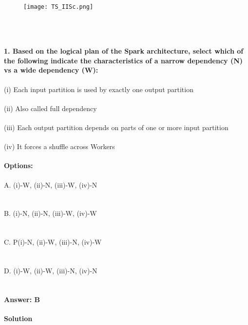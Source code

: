 \documentclass[prl,twocolumn,showpacs,preprintnumbers,superscriptaddress]{revtex4}
\theoremstyle{plain}
\theoremstyle{definition}
\begin{document}
\begin{widetext}
\\
\\
\\

\begin{wrapfigure}
\centering
\end{wrapfigure}
\begin{figure}[h!]
 \begin{right}
  \hfill\texttt{[image: TS\_IISc.png]}
 \end{right}
\end{figure}
\\
\\
\\
\noindent\textbf{1. Based on the logical plan of the Spark architecture, select which of the following
indicate the characteristics of a narrow dependency (N) vs a wide dependency
(W):}
\\
\\
(i) Each input partition is used by exactly one output partition
\\
\\
(ii) Also called full dependency
\\
\\
(iii) Each output partition depends on parts of one or more input partition
\\
\\
(iv) It forces a shuffle across Workers
\\
\\
\textbf{Options:}
\\
\\
\noindent A. (i)-W, (ii)-N, (iii)-W, (iv)-N
\\
\\
\\
B. (i)-N, (ii)-N, (iii)-W, (iv)-W
\\
\\
\\
C. P(i)-N, (ii)-W, (iii)-N, (iv)-W
\\
\\
\\
D. (i)-W, (ii)-W, (iii)-N, (iv)-N
\\
\\
\\
\textbf{Answer: B}
\\
\\
\textbf{Solution}
\\
\\

\end{widetext}
\end{document}
